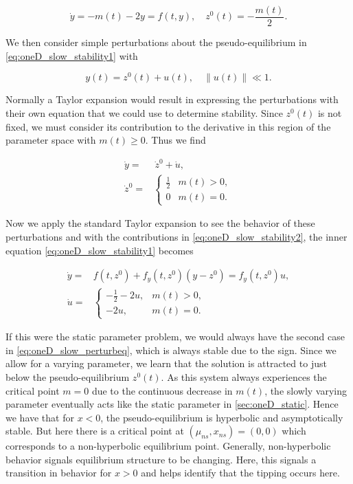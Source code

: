 \begin{equation}\label{eq:oneD_slow_stability1}
\dot{y}=-m(t)-2y=f(t,y), \quad z^0(t)=-\frac{m(t)}{2}.
\end{equation}

We then consider simple perturbations about the pseudo-equilibrium in \eqref{eq:oneD_slow_stability1} with

\begin{equation*}
y(t)=z^0(t)+u(t), \quad \lVert u(t) \rVert \ll 1.
\end{equation*}

Normally a Taylor expansion would result in expressing the perturbations with their own equation that we could use to determine stability. Since $z^0(t)$ is not fixed, we must consider its contribution to the derivative in this region of the parameter space with $m(t)\ge 0$. Thus we find

\begin{equation}\label{eq:oneD_slow_stability2}
\begin{aligned}
\dot{y} =& \,\dot{z}^0+\dot{u},\\
\dot{z}^0= & \begin{cases}
\frac{1}{2} & m(t)>0,\\
0 & m(t)=0.
\end{cases}
\end{aligned}
\end{equation}

Now we apply the standard Taylor expansion to see the behavior of these perturbations and with the contributions in \eqref{eq:oneD_slow_stability2}, the inner equation \eqref{eq:oneD_slow_stability1} becomes

\begin{equation}\label{eq:oneD_slow_perturbeq}
\begin{aligned}
\dot{y}=& f(t,z^0)+f_y(t,z^0)(y-z^0)
= f_y(t,z^0)u,\\
\dot{u}=&\begin{cases}
-\frac{1}{2}-2u, & m(t)>0,\\
-2u, & m(t)=0.
\end{cases}
\end{aligned}
\end{equation}

If this were the static parameter problem, we would always have the second case in \eqref{eq:oneD_slow_perturbeq}, which is always stable due to the sign. Since we allow for a varying parameter, we learn that the solution is attracted to just below the pseudo-equilibrium $z^0(t)$. As this system always experiences the critical point $m=0$ due to the continuous decrease in $m(t)$, the slowly varying parameter eventually acts like the static parameter in \autoref{sec:oneD_static}. Hence we have that for $x<0$, the pseudo-equilibrium is hyperbolic and asymptotically stable. But here there is a critical point at $(\mu_{ns},x_{ns})=(0,0)$ which corresponds to a non-hyperbolic equilibrium point. Generally, non-hyperbolic behavior signals equilibrium structure to be changing. Here, this signals a transition in behavior for $x>0$ and helps identify that the tipping occurs here.

